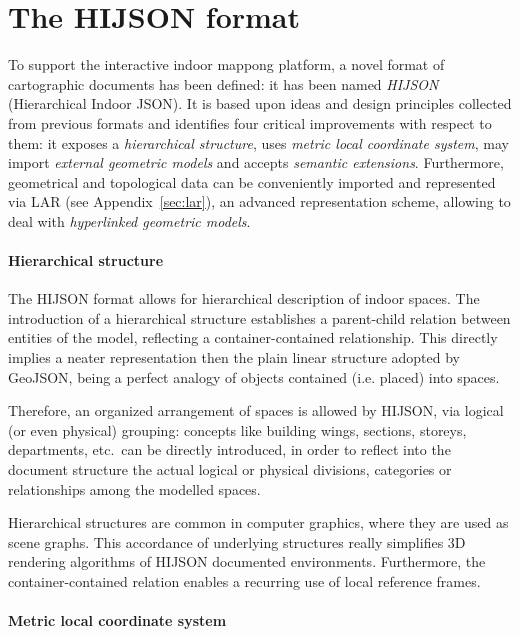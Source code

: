 \section{The HIJSON format}\label{hijson}

To support the interactive indoor mappong platform, a novel format of
cartographic documents has been defined: it has been named \emph{HIJSON}
(Hierarchical Indoor JSON). It is based upon ideas and design principles
collected from previous formats and identifies four critical improvements with
respect to them: it exposes a \emph{hierarchical structure}, uses \emph{metric
local coordinate system}, may import \emph{external geometric models} and
accepts \emph{semantic extensions}. Furthermore, geometrical  and topological
data can be conveniently imported and represented via LAR (see Appendix~\ref{sec:lar}), an
advanced representation scheme, allowing to deal with \emph{hyperlinked
geometric models}.



\paragraph*{Hierarchical structure}\label{hierarchical-structure}

The HIJSON format allows for hierarchical description of indoor spaces. The
introduction of a hierarchical structure establishes a parent-child relation
between entities of the model, reflecting a container-contained relationship.
This directly implies a neater representation then the plain linear structure
adopted by GeoJSON, being a perfect analogy of objects contained (i.e.
placed) into spaces.

Therefore, an organized arrangement of spaces is allowed by HIJSON, via
logical (or even physical) grouping: concepts like building wings, sections,
storeys, departments, etc.~can be directly introduced, in order to reflect
into the document structure the actual logical or physical divisions,
categories or relationships among the modelled spaces.

Hierarchical structures are common in computer graphics, where they are used
as scene graphs. This accordance of underlying structures really simplifies 3D
rendering algorithms of HIJSON documented environments. Furthermore, the
container-contained relation enables a recurring use of local reference
frames.

\paragraph*{Metric local coordinate system}\label{metric-local-coordinate-system}

